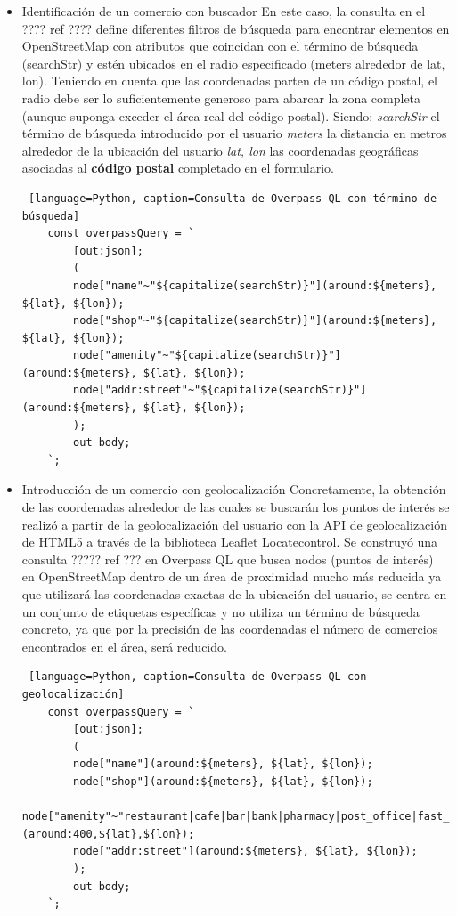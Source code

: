 \begin{itemize}
    \item Identificación de un comercio con buscador    
    En este caso, la consulta en el ???? ref ???? define diferentes filtros de búsqueda para encontrar elementos en OpenStreetMap con atributos que coincidan con el término de búsqueda (searchStr) y estén ubicados en el radio especificado (meters alrededor de lat, lon). Teniendo en cuenta que las coordenadas parten de un código postal, el radio debe ser lo suficientemente generoso para abarcar la zona completa (aunque suponga exceder el área real del código postal). Siendo:
    \subitem \textit{searchStr} el término de búsqueda introducido por el usuario
    \subitem \textit{meters} la distancia en metros alrededor de la ubicación del usuario
    \subitem \textit{lat, lon} las coordenadas geográficas asociadas al \textbf{código postal} completado en el formulario.
    
    \begin{lstlisting} [language=Python, caption=Consulta de Overpass QL con término de búsqueda]
    const overpassQuery = `
        [out:json];
        (
        node["name"~"${capitalize(searchStr)}"](around:${meters}, ${lat}, ${lon});
        node["shop"~"${capitalize(searchStr)}"](around:${meters}, ${lat}, ${lon});
        node["amenity"~"${capitalize(searchStr)}"](around:${meters}, ${lat}, ${lon});
        node["addr:street"~"${capitalize(searchStr)}"](around:${meters}, ${lat}, ${lon});
        );
        out body;
    `;
    \end{lstlisting}

    \item Introducción de un comercio con geolocalización 
    Concretamente, la obtención de las coordenadas alrededor de las cuales se buscarán los puntos de interés se realizó a partir de la geolocalización del usuario con la API de geolocalización de HTML5 a través de la biblioteca Leaflet Locatecontrol. Se construyó una consulta ????? ref ??? en Overpass QL que busca nodos (puntos de interés) en OpenStreetMap dentro de un área de proximidad mucho más reducida ya que utilizará las coordenadas exactas de la ubicación del usuario, se centra en un conjunto de etiquetas específicas y no utiliza un término de búsqueda concreto, ya que por la precisión de las coordenadas el número de comercios encontrados en el área, será reducido.
    \begin{lstlisting} [language=Python, caption=Consulta de Overpass QL con geolocalización]
    const overpassQuery = `
        [out:json];
        (
        node["name"](around:${meters}, ${lat}, ${lon});
        node["shop"](around:${meters}, ${lat}, ${lon});
        node["amenity"~"restaurant|cafe|bar|bank|pharmacy|post_office|fast_food|clinic|vending_machine"](around:400,${lat},${lon});
        node["addr:street"](around:${meters}, ${lat}, ${lon});               
        );
        out body;
    `;
    \end{lstlisting}

\end{itemize}

